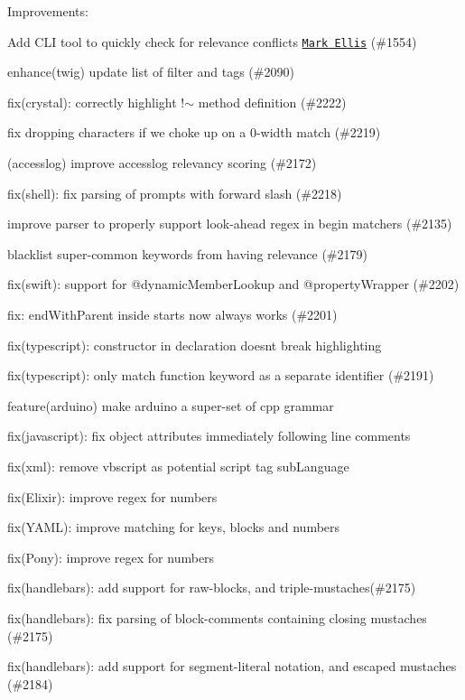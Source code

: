Improvements\+:
\begin{DoxyItemize}
\item Add C\+LI tool to quickly check for relevance conflicts \href{https://github.com/ellismarkf}{\tt Mark Ellis} (\#1554)
\item enhance(twig) update list of filter and tags (\#2090)
\item fix(crystal)\+: correctly highlight {\ttfamily !$\sim$} method definition (\#2222)
\item fix dropping characters if we choke up on a 0-\/width match (\#2219)
\item (accesslog) improve accesslog relevancy scoring (\#2172)
\item fix(shell)\+: fix parsing of prompts with forward slash (\#2218)
\item improve parser to properly support look-\/ahead regex in begin matchers (\#2135)
\item blacklist super-\/common keywords from having relevance (\#2179)
\item fix(swift)\+: support for {\ttfamily @dynamic\+Member\+Lookup} and {\ttfamily @property\+Wrapper} (\#2202)
\item fix\+: {\ttfamily end\+With\+Parent} inside {\ttfamily starts} now always works (\#2201)
\item fix(typescript)\+: constructor in declaration doesn\textquotesingle{}t break highlighting
\item fix(typescript)\+: only match function keyword as a separate identifier (\#2191)
\item feature(arduino) make arduino a super-\/set of cpp grammar
\item fix(javascript)\+: fix object attributes immediately following line comments
\item fix(xml)\+: remove {\ttfamily vbscript} as potential script tag sub\+Language
\item fix(\+Elixir)\+: improve regex for numbers
\item fix(\+Y\+A\+M\+L)\+: improve matching for keys, blocks and numbers
\item fix(\+Pony)\+: improve regex for numbers
\item fix(handlebars)\+: add support for raw-\/blocks, and triple-\/mustaches(\#2175)
\item fix(handlebars)\+: fix parsing of block-\/comments containing closing mustaches (\#2175)
\item fix(handlebars)\+: add support for segment-\/literal notation, and escaped mustaches (\#2184)

\end{DoxyItemize}
